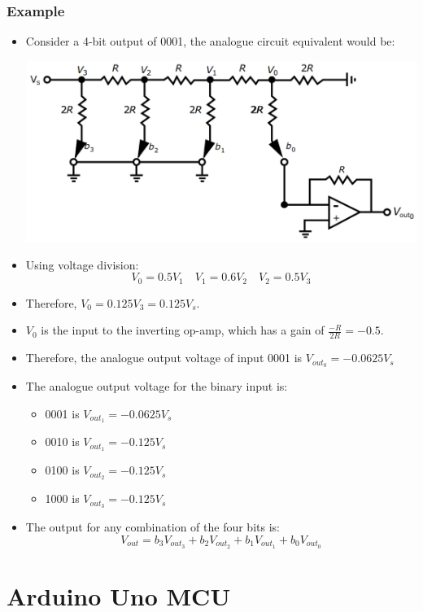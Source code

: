 \documentclass[11pt]{article}
\begin{document}
\subsubsection{Example}
\label{sec:org90b8fbc}
\begin{itemize}
\item Consider a 4-bit output of 0001, the analogue circuit equivalent would be:
\begin{center}
\includegraphics[width=.9\linewidth]{./images/digital-to-analogue-converter-analogue-circuit-equivalent-of-0001.png}
\end{center}
\item Using voltage division:
\[V_0 = 0.5 V_1 \quad V_1 = 0.6 V_2 \quad V_2 = 0.5 V_3\]
\item Therefore, \(V_0 = 0.125 V_3 = 0.125 V_s\).
\item \(V_0\) is the input to the inverting op-amp, which has a gain of \(\frac{-R}{2R} = -0.5\).
\item Therefore, the analogue output voltage of input 0001 is \(V_{out_0} = -0.0625V_s\)
\item The analogue output voltage for the binary input is:
\begin{itemize}
\item 0001 is \(V_{out_1} = - 0.0625 V_s\)
\item 0010 is \(V_{out_1} = - 0.125 V_s\)
\item 0100 is \(V_{out_2} = - 0.125 V_s\)
\item 1000 is \(V_{out_3} = - 0.125 V_s\)
\end{itemize}
\item The output for any combination of the four bits is:
\[V_{out} = b_3 V_{out_3} + b_2 V_{out_2} + b_1 V_{out_1} + b_0 V_{out_0}\]
\end{itemize}
\section{Arduino Uno MCU}
\label{sec:org19fc6b9}
\end{document}
